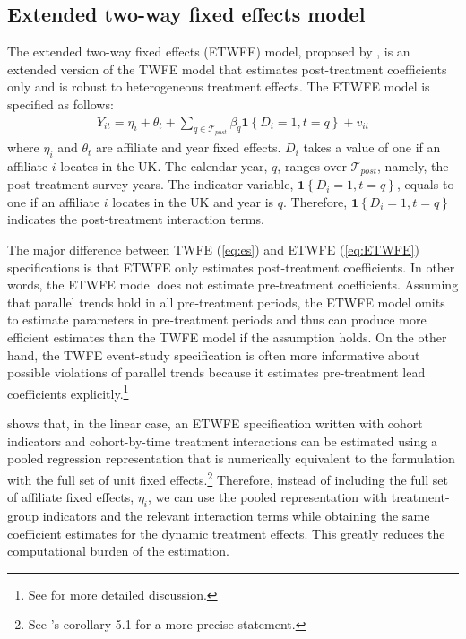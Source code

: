 \documentclass[preprint,11pt,authoryear]{elsarticle}
\begin{document}
\subsection{Extended two-way fixed effects model}\label{sec:etwfe_method}

The extended two-way fixed effects (ETWFE) model, proposed by \cite{wooldridge2021two}, is an extended version of the TWFE model that estimates post-treatment coefficients only and is robust to heterogeneous treatment effects.
The ETWFE model is specified as follows:
\begin{align}\label{eq:ETWFE}
Y_{i t}=
\eta_{i}
+
\theta_{t}
+
\sum_{q \in \mathcal{T}_{post}}
\beta_{q}
\mathbf{1}\left\{D_{i}=1, t=q \right\}
+
v_{i t}
\end{align}
where $\eta_{i}$ and $\theta_{t}$ are affiliate and year fixed effects.
$D_{i}$ takes a value of one if an affiliate $i$ locates in the UK.
The calendar year, $q$, ranges over $\mathcal{T}_{post}$, namely, the post-treatment survey years.
The indicator variable, $\mathbf{1}\left\{D_{i}=1, t=q\right\}$, equals to one if an affiliate $i$ locates in the UK and year is $q$.
Therefore, $\mathbf{1}\left\{D_{i}=1, t=q\right\}$ indicates the post-treatment interaction terms.

The major difference between TWFE (\ref{eq:es}) and ETWFE (\ref{eq:ETWFE}) specifications is that ETWFE only estimates post-treatment coefficients.
In other words, the ETWFE model does not estimate pre-treatment coefficients.
Assuming that parallel trends hold in all pre-treatment periods, the ETWFE model omits to estimate parameters in pre-treatment periods and thus can produce more efficient estimates than the TWFE model if the assumption holds.
On the other hand, the TWFE event-study specification is often more informative about possible violations of parallel trends because it estimates pre-treatment lead coefficients explicitly.\footnote{See \cite{callaway2023difference} for more detailed discussion.}

\cite{wooldridge2021two} shows that, in the linear case, an ETWFE specification written with cohort indicators and cohort-by-time treatment interactions can be estimated using a pooled regression representation that is numerically equivalent to the formulation with the full set of unit fixed effects.\footnote{See \cite{wooldridge2021two}'s corollary 5.1 for a more precise statement.}
Therefore, instead of including the full set of affiliate fixed effects, $\eta_{i}$, we can use the pooled representation with treatment-group indicators and the relevant interaction terms while obtaining the same coefficient estimates for the dynamic treatment effects.
This greatly reduces the computational burden of the estimation.
\end{document}
